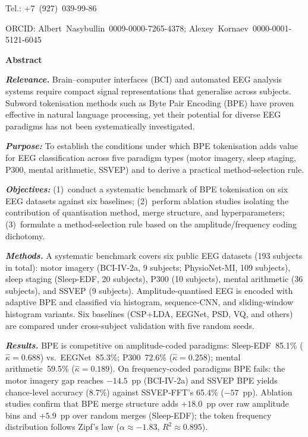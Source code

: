 \documentclass[14pt,a4paper]{extarticle}
\newcommand{\kap}{\ensuremath{\hat{\kappa}}}
\begin{document}
\noindent Tel.: +7~(927)~039-99-86

\noindent ORCID: Albert~Nasybullin~0009-0000-7265-4378;
Alexey~Kornaev~0000-0001-5121-6045

\medskip

\begin{mdframed}[backgroundcolor=gray!12, linewidth=0pt,
  innertopmargin=6pt, innerbottommargin=6pt,
  innerleftmargin=8pt, innerrightmargin=8pt]
\textbf{Abstract}

\textbf{\textit{Relevance.}}
Brain--computer interfaces (BCI) and automated EEG analysis systems
require compact signal representations that generalise across subjects.
Subword tokenisation methods such as Byte Pair Encoding (BPE) have
proven effective in natural language processing, yet their potential
for diverse EEG paradigms has not been systematically investigated.

\textbf{\textit{Purpose:}}
To establish the conditions under which BPE tokenisation adds value
for EEG classification across five paradigm types (motor imagery,
sleep staging, P300, mental arithmetic, SSVEP) and to derive a
practical method-selection rule.

\textbf{\textit{Objectives:}}
(1)~conduct a systematic benchmark of BPE tokenisation on six EEG datasets against six baselines;
(2)~perform ablation studies isolating the contribution of quantisation method, merge structure, and hyperparameters;
(3)~formulate a method-selection rule based on the amplitude/frequency coding dichotomy.

\textbf{\textit{Methods.}}
A systematic benchmark covers six public EEG datasets (193 subjects
in total): motor imagery (BCI-IV-2a, 9 subjects; PhysioNet-MI,
109 subjects), sleep staging (Sleep-EDF, 20 subjects), P300
(10 subjects), mental arithmetic (36 subjects), and SSVEP (9 subjects).
Amplitude-quantised EEG is encoded with adaptive BPE and classified
via histogram, sequence-CNN, and sliding-window histogram variants.
Six baselines (CSP+LDA, EEGNet, PSD, VQ, and others) are compared
under cross-subject validation with five random seeds.

\textbf{\textit{Results.}}
BPE is competitive on amplitude-coded paradigms: Sleep-EDF~85.1\%
($\kap{=}0.688$) vs.\ EEGNet~85.3\%; P300~72.6\% ($\kap{=}0.258$);
mental arithmetic~59.5\% ($\kap{=}0.189$).
On frequency-coded paradigms BPE fails: the motor imagery gap reaches
$-14.5$~pp (BCI-IV-2a) and SSVEP BPE yields chance-level accuracy
(8.7\%) against SSVEP-FFT's 65.4\% ($-57$~pp).
Ablation studies confirm that BPE merge structure adds $+18.0$~pp over
raw amplitude bins and $+5.9$~pp over random merges (Sleep-EDF);
the token frequency distribution follows Zipf's law
($\alpha{\approx}{-}1.83$, $R^2{\approx}0.895$).


\end{mdframed}
\end{document}
